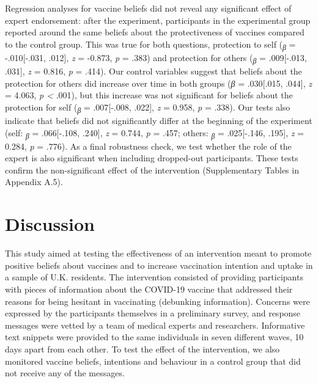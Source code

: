 \documentclass[authordate, empirical]{jote-new-article}
\begin{document}
	Regression analyses for vaccine beliefs did not reveal any significant effect of expert endorsement: after the experiment, participants in the experimental group reported around the same beliefs about the protectiveness of vaccines compared to the control group. This was true for both questions, protection to self (\textsubscript{\emph{β }}= -.010[-.031, .012], \emph{z }= -0.873, \emph{p }= .383) and protection for others (\textsubscript{\emph{β }}= .009[-.013, .031], \emph{z }= 0.816, \emph{p }= .414). Our control variables suggest that beliefs about the protection for others did increase over time in both groups (\emph{β }= .030[.015, .044], \emph{z }= 4.063, \emph{p < }.001), but this increase was not significant for beliefs about the protection for self (\textsubscript{\emph{β }}= .007[-.008, .022], \emph{z }= 0.958, \emph{p }= .338). Our tests also indicate that beliefs did not significantly differ at the beginning of the experiment (self: \textsubscript{\emph{β }}= .066[-.108, .240], \emph{z }= 0.744, \emph{p }= .457; others: \textsubscript{\emph{β }}= .025[-.146, .195], \emph{z }= 0.284, \emph{p }= .776). As a final robustness check, we test whether the role of the expert is also significant when including dropped-out participants. These tests confirm the non-significant effect of the intervention (Supplementary Tables in Appendix A.5).



	\section{Discussion}



	This study aimed at testing the effectiveness of an intervention meant to promote positive beliefs about vaccines and to increase vaccination intention and uptake in a sample of U.K. residents. The intervention consisted of providing participants with pieces of information about the COVID-19 vaccine that addressed their reasons for being hesitant in vaccinating (debunking information). Concerns were expressed by the participants themselves in a preliminary survey, and response messages were vetted by a team of medical experts and researchers. Informative text snippets were provided to the same individuals in seven different waves, 10 days apart from each other. To test the effect of the intervention, we also monitored vaccine beliefs, intentions and behaviour in a control group that did not receive any of the messages.
\end{document}
